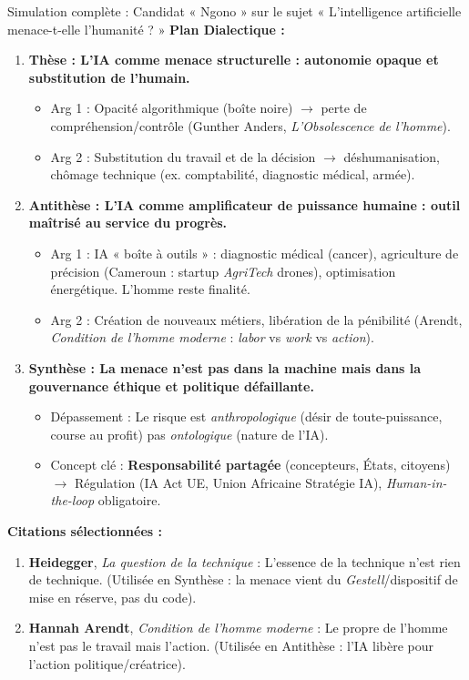 \documentclass[11pt]{article}
\newcommand{\cle}[1]{{\popxbold\color{popdark}#1}}
\begin{document}
\begin{exoresolu}{Simulation complète : Candidat « Ngono » sur le sujet « L'intelligence artificielle menace-t-elle l'humanité ? »}
\textbf{Plan Dialectique :}
\begin{enumerate}
    \item \textbf{Thèse : L'IA comme menace structurelle : autonomie opaque et substitution de l'humain.}
    \begin{itemize}
        \item Arg 1 : Opacité algorithmique (boîte noire) $\rightarrow$ perte de compréhension/contrôle (Gunther Anders, \emph{L'Obsolescence de l'homme}).
        \item Arg 2 : Substitution du travail et de la décision $\rightarrow$ déshumanisation, chômage technique (ex. comptabilité, diagnostic médical, armée).
    \end{itemize}
    \item \textbf{Antithèse : L'IA comme amplificateur de puissance humaine : outil maîtrisé au service du progrès.}
    \begin{itemize}
        \item Arg 1 : IA « boîte à outils » : diagnostic médical (cancer), agriculture de précision (Cameroun : startup \emph{AgriTech} drones), optimisation énergétique. L'homme reste finalité.
        \item Arg 2 : Création de nouveaux métiers, libération de la pénibilité (Arendt, \emph{Condition de l'homme moderne} : \emph{labor} vs \emph{work} vs \emph{action}).
    \end{itemize}
    \item \textbf{Synthèse : La menace n'est pas dans la machine mais dans la \cle{gouvernance éthique et politique} défaillante.}
    \begin{itemize}
        \item Dépassement : Le risque est \emph{anthropologique} (désir de toute-puissance, course au profit) pas \emph{ontologique} (nature de l'IA).
        \item Concept clé : \textbf{Responsabilité partagée} (concepteurs, États, citoyens) $\rightarrow$ Régulation (IA Act UE, Union Africaine Stratégie IA), \emph{Human-in-the-loop} obligatoire.
    \end{itemize}
\end{enumerate}

\textbf{Citations sélectionnées :}
\begin{enumerate}
    \item \textbf{Heidegger}, \emph{La question de la technique} : \og L'essence de la technique n'est rien de technique.\fg{} (Utilisée en Synthèse : la menace vient du \emph{Gestell}/dispositif de mise en réserve, pas du code).
    \item \textbf{Hannah Arendt}, \emph{Condition de l'homme moderne} : \og Le propre de l'homme n'est pas le travail mais l'action.\fg{} (Utilisée en Antithèse : l'IA libère pour l'action politique/créatrice).
\end{enumerate}


\end{exoresolu}
\end{document}
